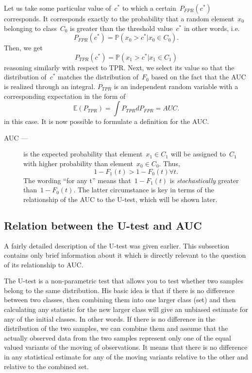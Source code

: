 \documentclass[]{scrreprt}
\begin{document}
Let us take some particular value of~$c^{*}$ to which a certain~$P_{FPR}(c^{*})$ corresponds. It corresponds exactly to the probability that a random element~$x_{0}$ belonging to class~$C_{0}$ is greater than the threshold value~$c^{*}$ in other words, i.e.
\begin{equation}\label{eq:AUC-computation-3}
P_{FPR}(c^{*}) = \mathbb{P}(x_{0}>c^{*}|x_{0} \in C_{0}).
\end{equation}
Then, we get
\begin{equation}\label{eq:AUC-computation-4}
P_{TPR}(c^{*}) = \mathbb{P}(x_{1}>c^{*}|x_{1} \in C_{1})
\end{equation}
reasoning similarly with respect to TPR. Next, we select its value so that the distribution of~$c^{*}$ matches the distribution of~$F_{0}$ based on the fact that the AUC is realized through an integral. $P_{TPR}$ is an independent random variable with a corresponding expectation in the form of
\begin{equation}\label{eq:AUC-computation-integral}
\mathbb{E}(P_{TPR}) = \int P_{TPR} d P_{FPR} = AUC.
\end{equation}
in this case. It is now possible to formulate a definition for the AUC.
\begin{description}
	\item[AUC ---] is the expected probability that element~$x_{1} \in C_{1}$ will be assigned to~$C_{1}$ with higher probability than element~$x_{0} \in C_{0}$. Thus,
	\begin{equation}\label{eq:AUC-definition}
	1-F_{1}(t)>1-F_{0}(t) \forall t.
	\end{equation}
	The wording ``for any t'' means that~$1-F_{1}(t)$ is \emph{stochastically} greater than~$1-F_{0}(t)$. The latter circumstance is key in terms of the relationship of the AUC to the U-test, which will be shown later.
\end{description}
%
\subsection{Relation between the U-test and AUC}\label{U-test&AUC-relation}
A fairly detailed description of the U-test was given earlier. This subsection contains only brief information about it which is directly relevant to the question of its relationship to AUC.

The U-test is a non-parametric test that allows you to test whether two samples belong to the same distribution. His basic idea is that if there is no difference between two classes, then combining them into one larger class (set) and then calculating any statistic for the new larger class will give an unbiased estimate for any of the initial classes. In other words. If there is no difference in the distribution of the two samples, we can combine them and assume that the actually observed data from the two samples represent only one of the equal valued variants of the moving of observations. It means that there is no difference in any statistical estimate for any of the moving variants relative to the other and relative to the combined set.
\end{document}
